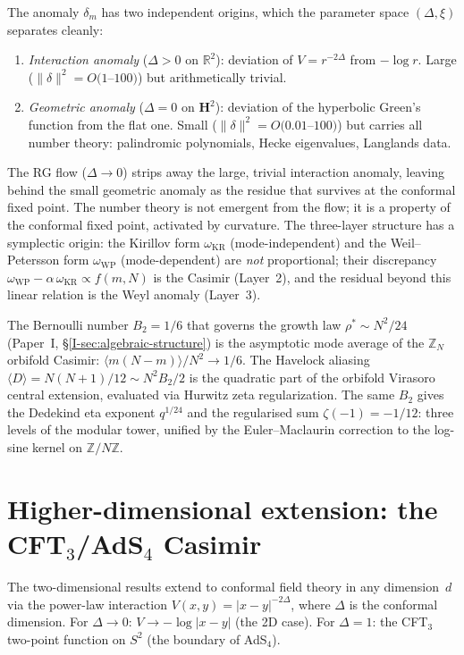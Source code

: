 The anomaly $\delta_m$ has two independent origins, which the
parameter space $(\Delta, \xi)$ separates cleanly:
\begin{enumerate}
\item \emph{Interaction anomaly} ($\Delta > 0$ on $\mathbb{R}^2$):
  deviation of $V = r^{-2\Delta}$ from $-\log r$.
  Large ($\|\delta\|^2 = O(1$--$100)$) but arithmetically trivial.
\item \emph{Geometric anomaly} ($\Delta = 0$ on $\mathbf{H}^2$):
  deviation of the hyperbolic Green's function from the flat one.
  Small ($\|\delta\|^2 = O(0.01$--$100)$) but carries all
  number theory: palindromic polynomials, Hecke eigenvalues,
  Langlands data.
\end{enumerate}
The RG flow ($\Delta \to 0$) strips away the large, trivial
interaction anomaly, leaving behind the small geometric anomaly
as the residue that survives at the conformal fixed point.
The number theory is not emergent from the flow; it is a property
of the conformal fixed point, activated by curvature.
The three-layer structure has a symplectic origin: the Kirillov
form $\omega_{\mathrm{KR}}$ (mode-independent) and the Weil--Petersson
form $\omega_{\mathrm{WP}}$ (mode-dependent) are \emph{not} proportional;
their discrepancy $\omega_{\mathrm{WP}} - \alpha\,\omega_{\mathrm{KR}}
\propto f(m,N)$ is the Casimir (Layer~2), and the residual beyond
this linear relation is the Weyl anomaly (Layer~3).

The Bernoulli number $B_2 = 1/6$ that governs the growth law
$\rho^* \sim N^2/24$ (Paper~I, \S\ref*{I-sec:algebraic-structure})
is the asymptotic mode average of the $\mathbb{Z}_N$ orbifold
Casimir: $\langle m(N{-}m)\rangle/N^2 \to 1/6$.
The Havelock aliasing $\langle D\rangle = N(N{+}1)/12 \sim N^2 B_2/2$
is the quadratic part of the orbifold Virasoro central extension,
evaluated via Hurwitz zeta regularization.
The same $B_2$ gives the Dedekind eta exponent $q^{1/24}$ and the
regularised sum $\zeta(-1) = -1/12$: three levels of the modular
tower, unified by the Euler--Maclaurin correction to the log-sine
kernel on $\mathbb{Z}/N\mathbb{Z}$.


\section{Higher-dimensional extension: the CFT$_3$/AdS$_4$ Casimir}
\label{sec:cft3}

The two-dimensional results extend to conformal field theory in
any dimension~$d$ via the power-law interaction
$V(x,y) = |x - y|^{-2\Delta}$, where $\Delta$ is the conformal
dimension. For $\Delta \to 0$: $V \to -\log|x-y|$ (the 2D case).
For $\Delta = 1$: the CFT$_3$ two-point function on $S^2$
(the boundary of AdS$_4$).

